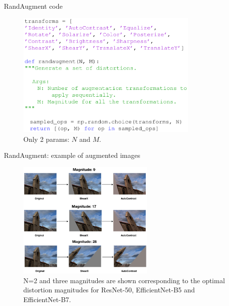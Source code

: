 \documentclass{beamer}
\begin{document}
\begin{frame}{RandAugment code}

\begin{figure}[h]
\includegraphics[width=0.8\textwidth]{img/code}
\caption{Only 2 params: $N$ and $M$.}
\end{figure}

\end{frame}
\begin{frame}{RandAugment: example of augmented images}

\begin{figure}[h]
\includegraphics[width=0.6\textwidth]{img/examples}
\caption{N=2 and three magnitudes are shown corresponding to the optimal distortion magnitudes for ResNet-50, EfficientNet-B5 and EfficientNet-B7.}
\end{figure}

\end{frame}
\end{document}
